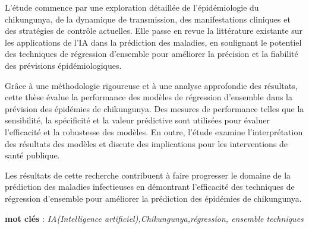 L'étude commence par une exploration détaillée de l'épidémiologie du chikungunya, de la dynamique de transmission, des manifestations cliniques et des stratégies de contrôle actuelles. Elle passe en revue la littérature existante sur les applications de l'IA dans la prédiction des maladies, en soulignant le potentiel des techniques de régression d'ensemble pour améliorer la précision et la fiabilité des prévisions épidémiologiques.

Grâce à une méthodologie rigoureuse et à une analyse approfondie des résultats, cette thèse évalue la performance des modèles de régression d'ensemble dans la prévision des épidémies de chikungunya. Des mesures de performance telles que la sensibilité, la spécificité et la valeur prédictive sont utilisées pour évaluer l'efficacité et la robustesse des modèles. En outre, l'étude examine l'interprétation des résultats des modèles et discute des implications pour les interventions de santé publique.

Les résultats de cette recherche contribuent à faire progresser le domaine de la prédiction des maladies infectieuses en démontrant l'efficacité des techniques de régression d'ensemble pour améliorer la prédiction des épidémies de chikungunya.

\textbf{mot clés }: \textit{IA(Intelligence artificiel),Chikungunya,régression, ensemble techniques}

